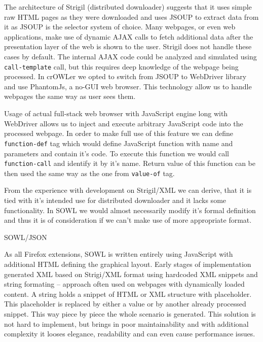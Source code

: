 The architecture of Strigil (distributed downloader) suggests that it uses
simple raw HTML pages as they were downloaded and uses JSOUP to extract data
from it as JSOUP is the selector system of choice. Many webpages, or even web
applications, make use of dynamic AJAX calls to fetch additional data after the
presentation layer of the web is shown to the user. Strigil does not handle
these cases by default. The internal AJAX code could be analyzed and simulated
using {\tt call-template} call, but this requires deep knowledge of the webpage
being processed. In crOWLer we opted to switch from JSOUP to WebDriver library
and use PhantomJs, a no-GUI web browser. This technology allow us to handle
webpages the same way as user sees them. 

Usage of actual full-stack web browser with JavaScript engine long with
WebDriver allows us to inject and execute arbitrary JavaScript code into the
processed webpage. In order to make full use of this feature we can define {\tt
function-def} tag which would define JavaScript function with name and
parameters and contain it's code. To execute this function we would call {\tt
function-call} and identify it by it's name. Return value of this function can
be then used the same way as the one from {\tt value-of} tag. 

From the experience with development on Strigil/XML we can derive, that it is
tied with it's intended use for distributed downloader and it lacks some
functionality. In SOWL we would almost necessarily modify it's formal definition
and thus it is of consideration if we can't make use of more appropriate
format. 


\secc SOWL/JSON

As all Firefox extensions, SOWL is written entirely using JavaScript with
additional HTML defining the graphical layout. Early stages of implementation
generated XML based on Strigi/XML format using hardcoded XML snippets and
string formating -- approach often used on webpages with dynamically loaded
content. A string holds a snippet of HTML or XML structure with placeholder.
This placeholder is replaced by either a value or by another already processed
snippet. This way piece by piece the whole scenario is generated. This solution
is not hard to implement, but brings in poor maintainability and with additional
complexity it looses elegance, readability and can even cause performance
issues. 

